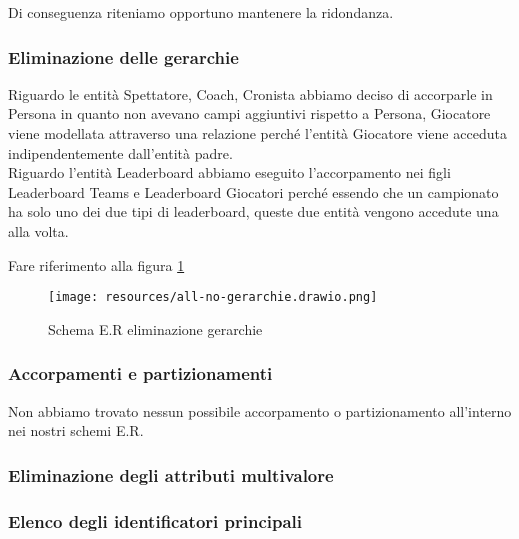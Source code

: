 \documentclass{article}
\begin{document}
Di conseguenza riteniamo opportuno mantenere la ridondanza.

\subsubsection{Eliminazione delle gerarchie}

Riguardo le entità Spettatore, Coach, Cronista abbiamo deciso di accorparle in Persona in quanto non avevano campi aggiuntivi rispetto a Persona, Giocatore viene modellata attraverso una relazione perché l'entità Giocatore viene acceduta indipendentemente dall'entità padre. \\
Riguardo l'entità Leaderboard abbiamo eseguito l'accorpamento nei figli Leaderboard Teams e Leaderboard Giocatori perché essendo che un campionato ha solo uno dei due tipi di leaderboard, queste due entità vengono accedute una alla volta.

Fare riferimento alla figura \ref{fig_eliminazione_gerarchie}

\begin{figure}
    \centering
    \texttt{[image: resources/all-no-gerarchie.drawio.png]}
    \caption{Schema E.R eliminazione gerarchie}
    \label{fig_eliminazione_gerarchie}
\end{figure}


\subsubsection{Accorpamenti e partizionamenti}

Non abbiamo trovato nessun possibile accorpamento o partizionamento all'interno nei nostri schemi E.R.

\subsubsection{Eliminazione degli attributi multivalore}

\subsubsection{Elenco degli identificatori principali}
\end{document}
